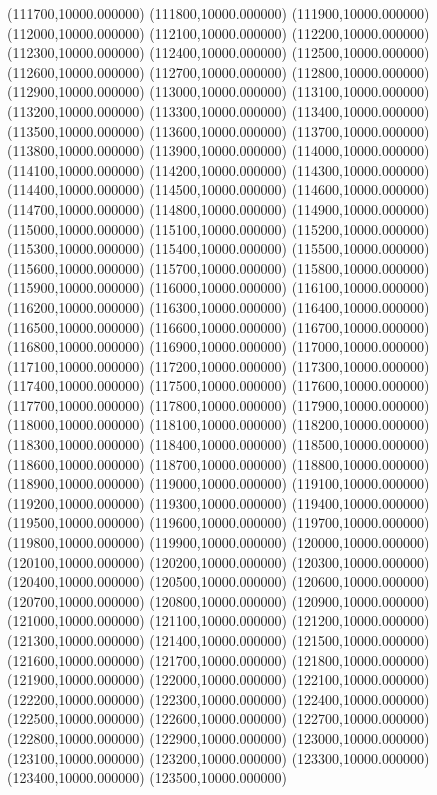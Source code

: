 (111700,10000.000000)
(111800,10000.000000)
(111900,10000.000000)
(112000,10000.000000)
(112100,10000.000000)
(112200,10000.000000)
(112300,10000.000000)
(112400,10000.000000)
(112500,10000.000000)
(112600,10000.000000)
(112700,10000.000000)
(112800,10000.000000)
(112900,10000.000000)
(113000,10000.000000)
(113100,10000.000000)
(113200,10000.000000)
(113300,10000.000000)
(113400,10000.000000)
(113500,10000.000000)
(113600,10000.000000)
(113700,10000.000000)
(113800,10000.000000)
(113900,10000.000000)
(114000,10000.000000)
(114100,10000.000000)
(114200,10000.000000)
(114300,10000.000000)
(114400,10000.000000)
(114500,10000.000000)
(114600,10000.000000)
(114700,10000.000000)
(114800,10000.000000)
(114900,10000.000000)
(115000,10000.000000)
(115100,10000.000000)
(115200,10000.000000)
(115300,10000.000000)
(115400,10000.000000)
(115500,10000.000000)
(115600,10000.000000)
(115700,10000.000000)
(115800,10000.000000)
(115900,10000.000000)
(116000,10000.000000)
(116100,10000.000000)
(116200,10000.000000)
(116300,10000.000000)
(116400,10000.000000)
(116500,10000.000000)
(116600,10000.000000)
(116700,10000.000000)
(116800,10000.000000)
(116900,10000.000000)
(117000,10000.000000)
(117100,10000.000000)
(117200,10000.000000)
(117300,10000.000000)
(117400,10000.000000)
(117500,10000.000000)
(117600,10000.000000)
(117700,10000.000000)
(117800,10000.000000)
(117900,10000.000000)
(118000,10000.000000)
(118100,10000.000000)
(118200,10000.000000)
(118300,10000.000000)
(118400,10000.000000)
(118500,10000.000000)
(118600,10000.000000)
(118700,10000.000000)
(118800,10000.000000)
(118900,10000.000000)
(119000,10000.000000)
(119100,10000.000000)
(119200,10000.000000)
(119300,10000.000000)
(119400,10000.000000)
(119500,10000.000000)
(119600,10000.000000)
(119700,10000.000000)
(119800,10000.000000)
(119900,10000.000000)
(120000,10000.000000)
(120100,10000.000000)
(120200,10000.000000)
(120300,10000.000000)
(120400,10000.000000)
(120500,10000.000000)
(120600,10000.000000)
(120700,10000.000000)
(120800,10000.000000)
(120900,10000.000000)
(121000,10000.000000)
(121100,10000.000000)
(121200,10000.000000)
(121300,10000.000000)
(121400,10000.000000)
(121500,10000.000000)
(121600,10000.000000)
(121700,10000.000000)
(121800,10000.000000)
(121900,10000.000000)
(122000,10000.000000)
(122100,10000.000000)
(122200,10000.000000)
(122300,10000.000000)
(122400,10000.000000)
(122500,10000.000000)
(122600,10000.000000)
(122700,10000.000000)
(122800,10000.000000)
(122900,10000.000000)
(123000,10000.000000)
(123100,10000.000000)
(123200,10000.000000)
(123300,10000.000000)
(123400,10000.000000)
(123500,10000.000000)
